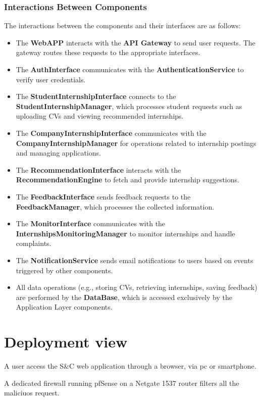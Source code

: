 \subsubsection{Interactions Between Components}
The interactions between the components and their interfaces are as follows:
\begin{itemize}
    \item The \textbf{WebAPP} interacts with the \textbf{API Gateway} to send user requests. The gateway routes these requests to the appropriate interfaces.
    \item The \textbf{AuthInterface} communicates with the \textbf{AuthenticationService} to verify user credentials.
    \item The \textbf{StudentInternshipInterface} connects to the \textbf{StudentInternshipManager}, which processes student requests such as uploading CVs and viewing recommended internships.
    \item The \textbf{CompanyInternshipInterface} communicates with the \textbf{CompanyInternshipManager} for operations related to internship postings and managing applications.
    \item The \textbf{RecommendationInterface} interacts with the \textbf{RecommendationEngine} to fetch and provide internship suggestions.
    \item The \textbf{FeedbackInterface} sends feedback requests to the \textbf{FeedbackManager}, which processes the collected information.
    \item The \textbf{MonitorInterface} communicates with the \textbf{InternshipsMonitoringManager} to monitor internships and handle complaints.
    \item The \textbf{NotificationService} sends email notifications to users based on events triggered by other components.
    \item All data operations (e.g., storing CVs, retrieving internships, saving feedback) are performed by the \textbf{DataBase}, which is accessed exclusively by the Application Layer components.
\end{itemize}

\section{Deployment view}\label{subsec:deployment-view}
    A user access the S\&C web application through a browser, via pc or smartphone. 

    A dedicated firewall running pfSense on a Netgate 1537 router filters all the maliciuos request.
    
